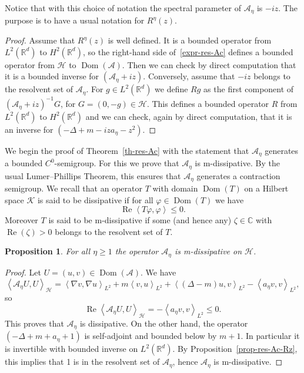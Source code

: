 \documentclass[11pt]{article}
\newtheorem{prop}[theo]{Proposition}
\theoremstyle{definition}
\numberwithin{equation}{section}
\numberwithin{figure}{section}
\numberwithin{table}{section}
\newcommand{\innp}[2]{\left< #1, #2 \right>}
\renewcommand{\leq}{\leqslant}
\renewcommand{\geq}{\geqslant}
\newcommand{\inv}{^{-1}}
\newcommand{\1}{\mathds 1}
\DeclareMathOperator{\Reop}{Re}
\DeclareMathOperator{\Dom}{Dom}
\renewcommand{\Re}{\Reop}
\newcommand{\R}{\mathbb{R}}
\newcommand{\D}{\Delta}
\newcommand{\z}{\zeta}
\newcommand{\f}{\varphi}
\newcommand{\Ac}{{\mathcal A}}
\newcommand{\Kc}{{\mathcal K}}
\newcommand{\HH}{\mathcal H}
\begin{document}
Notice that with this choice of notation the spectral parameter of $\Ac_\eta$ is $-iz$. The purpose is to have a usual notation for $R^\eta(z)$.

\begin{proof}
Assume that $R^\eta(z)$ is well defined. It is a bounded operator from $L^2(\R^d)$ to $H^2(\R^d)$, so the right-hand side of~\eqref{expr-res-Ac} defines a bounded operator from $\HH$ to $\Dom(\Ac)$. Then we can check by direct computation that it is a bounded inverse for $(\Ac_\eta + iz)$. Conversely, assume that $-iz$ belongs to the resolvent set of $\Ac_\eta$. For $g \in L^2(\R^d)$ we define $Rg$ as the first component of $(\Ac_\eta + iz)\inv G$, for $G = (0,-g) \in \HH$. This defines a bounded operator $R$ from $L^2(\R^d)$ to $H^2(\R^d)$ and we can check, again by direct computation, that it is an inverse for ${(-\D + m - iza_\eta - z^2)}$.
\end{proof}

We begin the proof of Theorem~\ref{th-res-Ac} with the statement that $\Ac_\eta$ generates a bounded $C^0$-semigroup. For this we prove that $\Ac_\eta$ is \textsf{m}-dissipative. By the usual Lumer--Phillips Theorem, this ensures that $\Ac_\eta$ generates a contraction semigroup. We recall that an operator $T$ with domain $\Dom(T)$ on a Hilbert space $\Kc$ is said to be dissipative if for all $\f \in \Dom(T)$ we have
\[
\Re \innp{T\f}{\f} \leq 0.
\]
Moreover $T$ is said to be \textsf{m}-dissipative if some (and hence any) $\z \in \mathbb C$ with $\Re(\z) > 0$ belongs to the resolvent set of $T$.

\begin{prop}\label{prop-Ac-diss}
For all $\eta \geq 1$ the operator $\Ac_\eta$ is \textsf{m}-dissipative on $\HH$.
\end{prop}

\begin{proof}
Let $U = (u,v) \in \Dom(\Ac)$. We have
\[
\innp{\Ac_\eta U}{U}_\HH = \innp{\nabla v}{\nabla u}_{L^2} + m \innp{v}{u}_{L^2} + \innp{(\D - m) u}{v}_{L^2} - \innp{a_\eta v}{v}_{L^2},
\]
so
\[
\Re \innp{\Ac_\eta U}{U}_\HH = - \innp{a_\eta v}{v}_{L^2} \leq 0.
\]
This proves that $\Ac_\eta$ is dissipative. On the other hand, the operator $(-\D + m + a_\eta + 1)$ is self-adjoint and bounded below by $m+1$. In particular it is invertible with bounded inverse on $L^2(\R^d)$. By Proposition~\ref{prop-res-Ac-Rz}, this implies that 1 is in the resolvent set of $\Ac_\eta$, hence $\Ac_\eta$ is \textsf{m}-dissipative.
\end{proof}
\end{document}
